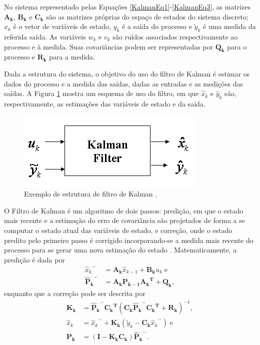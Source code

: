 No sistema representado pelas Equações \ref{KalmanEq1}-\ref{KalmanEq3}, as matrizes $\mathbf{A_k}$, $\mathbf{B_k}$ e $\mathbf{C_k}$ são as matrizes próprias do espaço de estados do sistema discreto; $x_k$ é o vetor de variáveis de estado, $y_k$ é a saída do processo e $\tilde{y}_k$ é uma medida da referida saída. As variáveis $w_k$ e $v_k$ são ruídos associados respectivamente ao processo e à medida. Suas covariâncias podem ser representadas por $\mathbf{Q_k}$ para o processo e $\mathbf{R_k}$ para a medida.

Dada a estrutura do sistema, o objetivo do uso do filtro de Kalman é estimar os dados do processo e a medida das saídas, dadas as entradas e as medições das saídas. A Figura \ref{Kalman2} mostra um esquema de uso do filtro, em que $\hat{x}_k$ e $\hat{y}_k$ são, respectivamente, as estimações das variáveis de estado e da saída.
\begin{figure}[!ht]
\centering
\includegraphics[width=.5\linewidth]{figs/kalman/kalman2}
\caption{Exemplo de estrutura de filtro de Kalman \cite{GoddardKalman}. \label{Kalman2}}
\end{figure}

O Filtro de Kalman é um algoritmo de dois passos: predição, em que o estado mais recente e a estimação do erro de covariância são projetados de forma a se computar o estado atual das variáveis de estado, e correção, onde o estado predito pelo primeiro passo é corrigido incorporando-se a medida mais recente do processo para se gerar uma nova estimação do estado \cite{GoddardKalman}. Matematicamente, a predição é dada por
\begin{align}
	\label{KalmanEq4} {\hat{x}_{k}}^{-} &= \mathbf{A_k} \hat{x}_{k-1} + \mathbf{B_k} u_k\;\mathrm{e} \\
	\label{KalmanEq5} \mathbf{{\hat{P}_{k}}^{-}} &= \mathbf{A_k}\mathbf{P_{k-1}}\mathbf{{A_k}^T} + \mathbf{Q_k},
\end{align}
 enquanto que a correção pode ser descrita por
\begin{align}
	\label{KalmanEq6} \mathbf{K_k} &= \mathbf{{\hat{P}_{k}}^{-}}\mathbf{{C_k}^T} {\left( \mathbf{C_k}\mathbf{{\hat{P}_{k}}^{-}}\mathbf{{C_k}^T} + \mathbf{R_k} \right)}^{-1}, \\
	\label{KalmanEq7} \hat{x}_k &= {\hat{x}_{k}}^{-} + \mathbf{K_k} \left( \tilde{y}_k - \mathbf{C_k}{\hat{x}_{k}}^{-} \right)\;\mathrm{e} \\
	\label{KalmanEq8} \mathbf{P_k} &= \left( \mathbf{I} - \mathbf{K_k}\mathbf{C_k}\right)\mathbf{{\hat{P}_{k}}^{-}}.
\end{align} 

